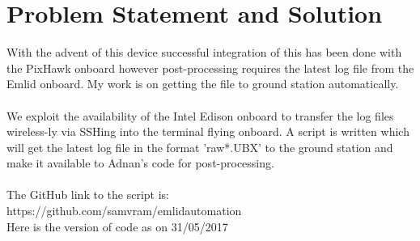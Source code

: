 \documentclass[12pt]{report}
\begin{document}
\section{Problem Statement and Solution}
With the advent of this device successful integration of this has been done with the PixHawk onboard however post-processing requires the latest log file from the Emlid onboard. My work is on getting the file to ground station automatically.
 \\
 \\
We exploit the availability of the Intel Edison onboard to transfer the log files wireless-ly via SSHing into the terminal flying onboard. A script is written which will get the latest log file in the format 'raw*.UBX' to the ground station and make it available to Adnan's code for post-processing.
\\
\\
The GitHub link to the script is: \\ https://github.com/samvram/emlidautomation
\\ 
Here is the version of code as on 31/05/2017
\\
\end{document}
